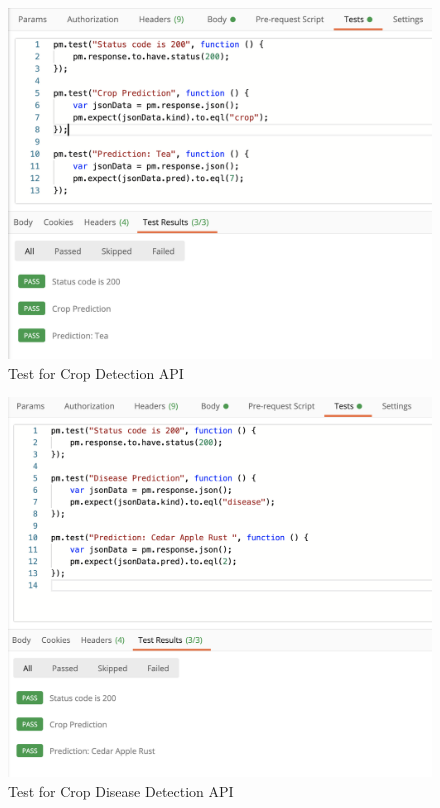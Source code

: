 \documentclass[../Report.tex]{subfiles}
\begin{document}
\begin{figure}[H]
  \centering
  \includegraphics[width=0.8\linewidth]{images/api_crop.png}
  \caption{Test for Crop Detection API}
  \label{fig:test_api_crop}
\end{figure}
\begin{figure}[H]
  \centering
  \includegraphics[width=0.8\linewidth]{images/api_disease.png}
  \caption{Test for Crop Disease Detection API}
  \label{fig:test_api_disease}
\end{figure}

\end{document}
